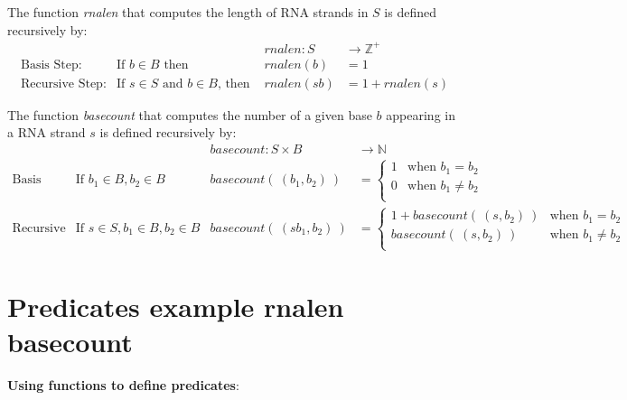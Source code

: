 \documentclass[12pt, oneside]{article}
\begin{document}
The function \textit{rnalen} that computes the length of RNA strands in $S$ is defined recursively by:
\[
\begin{array}{llll}
& & \textit{rnalen} : S & \to \mathbb{Z}^+ \\
\textrm{Basis Step:} & \textrm{If } b \in B\textrm{ then } & \textit{rnalen}(b) & = 1 \\
\textrm{Recursive Step:} & \textrm{If } s \in S\textrm{ and }b \in B\textrm{, then  } & \textit{rnalen}(sb) & = 1 + \textit{rnalen}(s)
\end{array}
\]

The function \textit{basecount} that computes the number of a given base 
$b$ appearing in a RNA strand $s$ is defined recursively by:
\[
\begin{array}{llll}
& & \textit{basecount} : S \times B & \to \mathbb{N} \\
\textrm{Basis Step:} &  \textrm{If } b_1 \in B, b_2 \in B & \textit{basecount}(~(b_1, b_2)~) & =
        \begin{cases}
            1 & \textrm{when } b_1 = b_2 \\
            0 & \textrm{when } b_1 \neq b_2 \\
        \end{cases} \\
\textrm{Recursive Step:} & \textrm{If } s \in S, b_1 \in B, b_2 \in B &\textit{basecount}(~(s b_1, b_2)~) & =
        \begin{cases}
            1 + \textit{basecount}(~(s, b_2)~) & \textrm{when } b_1 = b_2 \\
            \textit{basecount}(~(s, b_2)~) & \textrm{when } b_1 \neq b_2 \\
        \end{cases}
\end{array}
\] \vfill
\section*{Predicates example rnalen basecount}


{\bf Using functions to define predicates}:

\end{document}
